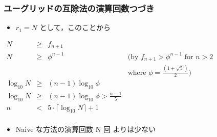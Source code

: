 \begin{frame}
\frametitle{ユーグリッドの互除法の演算回数\textemdash つづき}
  \begin{itemize}
\item $r_1=N$ として，このことから
  \end{itemize}
  \begin{center}  
    \begin{math}
      \begin{array}{rcll}
N&\ge& f_{n+1}\\
N&\ge& \phi^{n-1}&(\mbox{by }f_{n+1}>\phi^{n-1} \mbox{ for }n>2\\
                &&&\mbox{where }\phi=\frac{(1+\sqrt{5})}{2})\\
\log_{10}N&\ge&(n-1)\log_{10}\phi\\
\log_{10}N&\ge&(n-1)\log_{10}\phi>\frac{n-1}{5}\\
n&<&5\cdot\lceil\log_{10}N\rceil+1\\
      \end{array}
    \end{math}
  \end{center}
  \begin{itemize}
\item Naive な方法の演算回数 N 回 よりは少ない
  \end{itemize}
\end{frame}
